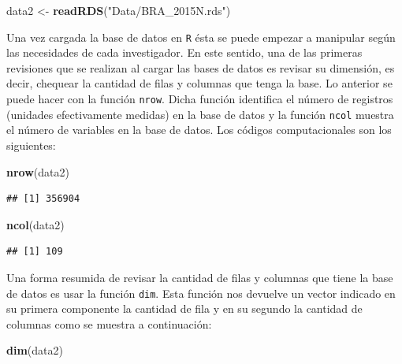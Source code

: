 \documentclass[
  spanish,
  12pt,
]{book}
\newenvironment{Shaded}{\begin{snugshade}}{\end{snugshade}}
\newcommand{\FunctionTok}[1]{\textcolor[rgb]{0.13,0.29,0.53}{\textbf{#1}}}
\newcommand{\NormalTok}[1]{#1}
\newcommand{\OtherTok}[1]{\textcolor[rgb]{0.56,0.35,0.01}{#1}}
\newcommand{\StringTok}[1]{\textcolor[rgb]{0.31,0.60,0.02}{#1}}
\begin{document}
\begin{Shaded}
\begin{Highlighting}[]
\NormalTok{data2 }\OtherTok{\textless{}{-}} \FunctionTok{readRDS}\NormalTok{(}\StringTok{"Data/BRA\_2015N.rds"}\NormalTok{)}
\end{Highlighting}
\end{Shaded}

Una vez cargada la base de datos en \texttt{R} ésta se puede empezar a manipular según las necesidades de cada investigador. En este sentido, una de las primeras revisiones que se realizan al cargar las bases de datos es revisar su dimensión, es decir, chequear la cantidad de filas y columnas que tenga la base. Lo anterior se puede hacer con la función \texttt{nrow}. Dicha función identifica el número de registros (unidades efectivamente medidas) en la base de datos y la función \texttt{ncol} muestra el número de variables en la base de datos. Los códigos computacionales son los siguientes:

\begin{Shaded}
\begin{Highlighting}[]
\FunctionTok{nrow}\NormalTok{(data2)}
\end{Highlighting}
\end{Shaded}

\begin{verbatim}
## [1] 356904
\end{verbatim}

\begin{Shaded}
\begin{Highlighting}[]
\FunctionTok{ncol}\NormalTok{(data2)}
\end{Highlighting}
\end{Shaded}

\begin{verbatim}
## [1] 109
\end{verbatim}

Una forma resumida de revisar la cantidad de filas y columnas que tiene la base de datos es usar la función \texttt{dim}. Esta función nos devuelve un vector indicado en su primera componente la cantidad de fila y en su segundo la cantidad de columnas como se muestra a continuación:

\begin{Shaded}
\begin{Highlighting}[]
\FunctionTok{dim}\NormalTok{(data2)}
\end{Highlighting}
\end{Shaded}
\end{document}
